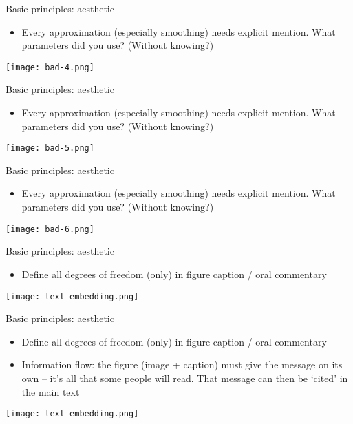 \documentclass[10pt]{beamer}
\begin{document}
\begin{frame}{Basic principles: aesthetic}
    \begin{itemize}
    \item Every approximation (especially smoothing) needs explicit mention. What parameters did you use? (Without knowing?)
    \end{itemize}
    \texttt{[image: bad-4.png]}
\end{frame}
\begin{frame}{Basic principles: aesthetic}
    \begin{itemize}
    \item Every approximation (especially smoothing) needs explicit mention. What parameters did you use? (Without knowing?)
    \end{itemize}
    \texttt{[image: bad-5.png]}
\end{frame}
\begin{frame}{Basic principles: aesthetic}
    \begin{itemize}
    \item Every approximation (especially smoothing) needs explicit mention. What parameters did you use? (Without knowing?)
    \end{itemize}
    \texttt{[image: bad-6.png]}
\end{frame}

\begin{frame}{Basic principles: aesthetic}
    \begin{itemize}
    \item Define all degrees of freedom (only) in figure caption / oral commentary
    \end{itemize}
    \texttt{[image: text-embedding.png]}
\end{frame}

\begin{frame}{Basic principles: aesthetic}
    \begin{itemize}
    \item Define all degrees of freedom (only) in figure caption / oral commentary
      \item Information flow: the figure (image + caption) must give the message on its own -- it's all that some people will read. That message can then be `cited' in the main text
    \end{itemize}
    \centering
    \texttt{[image: text-embedding.png]}
\end{frame}
\end{document}
